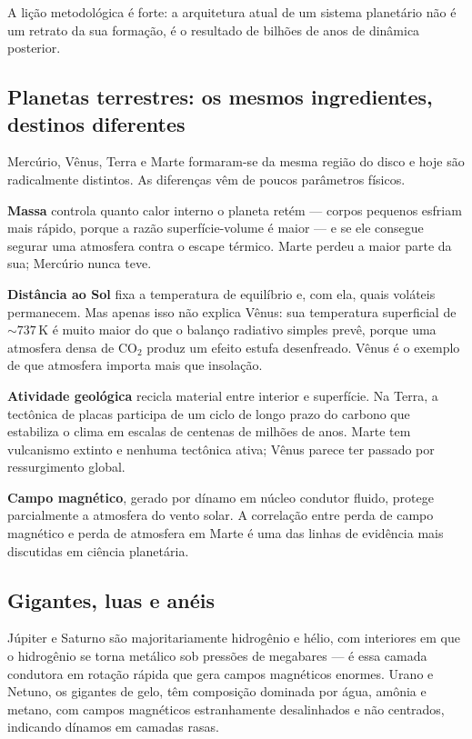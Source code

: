 \documentclass[11pt,a4paper]{article}
\begin{document}
A lição metodológica é forte: a arquitetura atual de um sistema planetário não é um retrato da sua formação, é o resultado de bilhões de anos de dinâmica posterior.

\subsection*{Planetas terrestres: os mesmos ingredientes, destinos diferentes}

Mercúrio, Vênus, Terra e Marte formaram-se da mesma região do disco e hoje são radicalmente distintos. As diferenças vêm de poucos parâmetros físicos.

\textbf{Massa} controla quanto calor interno o planeta retém --- corpos pequenos esfriam mais rápido, porque a razão superfície-volume é maior --- e se ele consegue segurar uma atmosfera contra o escape térmico. Marte perdeu a maior parte da sua; Mercúrio nunca teve.

\textbf{Distância ao Sol} fixa a temperatura de equilíbrio e, com ela, quais voláteis permanecem. Mas apenas isso não explica Vênus: sua temperatura superficial de $\sim737\,\mathrm{K}$ é muito maior do que o balanço radiativo simples prevê, porque uma atmosfera densa de CO$_2$ produz um efeito estufa desenfreado. Vênus é o exemplo de que atmosfera importa mais que insolação.

\textbf{Atividade geológica} recicla material entre interior e superfície. Na Terra, a tectônica de placas participa de um ciclo de longo prazo do carbono que estabiliza o clima em escalas de centenas de milhões de anos. Marte tem vulcanismo extinto e nenhuma tectônica ativa; Vênus parece ter passado por ressurgimento global.

\textbf{Campo magnético}, gerado por dínamo em núcleo condutor fluido, protege parcialmente a atmosfera do vento solar. A correlação entre perda de campo magnético e perda de atmosfera em Marte é uma das linhas de evidência mais discutidas em ciência planetária.

\subsection*{Gigantes, luas e anéis}

Júpiter e Saturno são majoritariamente hidrogênio e hélio, com interiores em que o hidrogênio se torna metálico sob pressões de megabares --- é essa camada condutora em rotação rápida que gera campos magnéticos enormes. Urano e Netuno, os gigantes de gelo, têm composição dominada por água, amônia e metano, com campos magnéticos estranhamente desalinhados e não centrados, indicando dínamos em camadas rasas.
\end{document}
